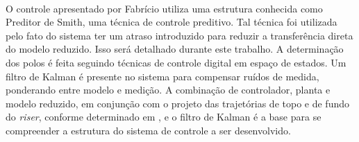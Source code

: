 \paragraph{} O controle apresentado por Fabrício \cite{fabricioIFAC} utiliza uma estrutura conhecida como Preditor de Smith, uma técnica de controle preditivo. Tal técnica foi utilizada pelo fato do sistema ter um atraso introduzido para reduzir a transferência direta do modelo reduzido. Isso será detalhado durante este trabalho. A determinação dos polos é feita seguindo técnicas de controle digital em espaço de estados. Um filtro de Kalman é presente no sistema para compensar ruídos de medida, ponderando entre modelo e medição. A combinação de controlador, planta e modelo reduzido, em conjunção com o projeto das trajetórias de topo e de fundo do \textit{riser}, conforme determinado em \cite{fabricioIFAC}, e o filtro de Kalman é a base para se compreender a estrutura do sistema de controle a ser desenvolvido.
